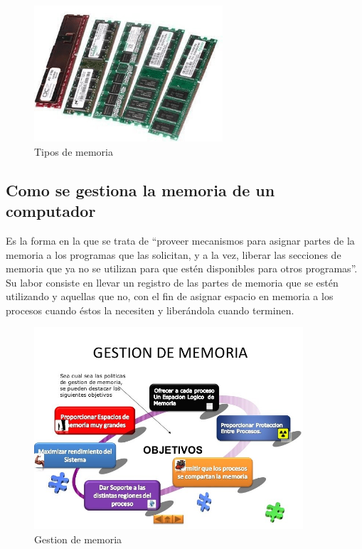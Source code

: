 \documentclass{article}
\begin{document}
 \vspace{1cm}

\begin{figure}[h]
\includegraphics[width=7cm]{tipos.png}
\centering
\caption{Tipos de memoria}
\label{fig:tipos}
\end{figure}

\subsection{Como se gestiona la memoria de un computador}

Es la forma en la que  se trata de “proveer mecanismos para asignar partes de la memoria a los programas que las solicitan, y a la vez, liberar las secciones de memoria que ya no se utilizan para que estén disponibles para otros programas”.  Su labor consiste en llevar un registro de las partes de memoria que se estén utilizando y aquellas que no, con el fin de asignar espacio en memoria a los procesos cuando éstos la necesiten y liberándola cuando terminen. \cite{gestion}

\begin{figure}[h]
\includegraphics[width=10cm]{gestion.png}
\centering
\caption{Gestion de memoria}
\label{fig:gestion}
\end{figure}
\end{document}

